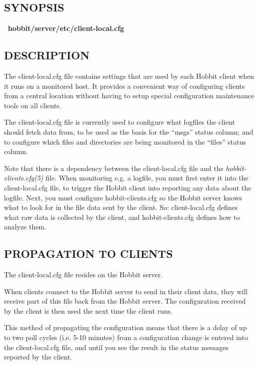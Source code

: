  
\subsection{SYNOPSIS}
\textbf{~hobbit/server/etc/client-local.cfg}


 
\subsection{DESCRIPTION}
 The client-local.cfg file contains settings that are used by each
 Hobbit client when it runs on a monitored host. It provides a
 convenient way of configuring clients from a central location without
 having to setup special configuration maintenance tools on all
 clients. 


  The client-local.cfg file is currently used to configure what logfiles the client should fetch data from, to be used as the basis for the ``msgs'' status column; and to configure which files and directories are being monitored in the ``files'' status column. 


  Note that there is a dependency between the client-local.cfg file
  and the \emph{hobbit-clients.cfg(5)} file. When monitoring e.g. a
  logfile, you must first enter it into the client-local.cfg file, to
  trigger the Hobbit client into reporting any data about the
  logfile. Next, you must configure hobbit-clients.cfg so the Hobbit
  server knows what to look for in the file data sent by the
  client. So: client-local.cfg defines what raw data is collected by
  the client, and hobbit-clients.cfg defines how to analyze them. 



 
\subsection{PROPAGATION TO CLIENTS}
 The client-local.cfg file resides on the Hobbit server. 

  When clients connect to the Hobbit server to send in their client
  data, they will receive part of this file back from the Hobbit
  server. The configuration received by the client is then used the
  next time the client runs. 



  This method of propagating the configuration means that there is a
  delay of up to two poll cycles (i.e. 5-10 minutes) from a
  configuration change is entered into the client-local.cfg file, and
  until you see the result in the status messages reported by the
  client. 



